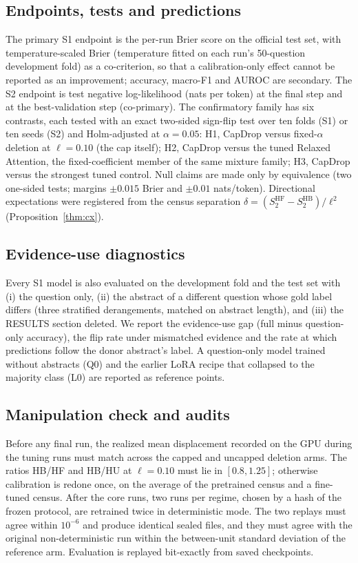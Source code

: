 \subsection{Endpoints, tests and predictions}
The primary S1 endpoint is the per-run Brier score on the official test set, with temperature-scaled
Brier (temperature fitted on each run's 50-question development fold) as a co-criterion, so that a
calibration-only effect cannot be reported as an improvement; accuracy, macro-F1 and AUROC are
secondary. The S2 endpoint is test negative log-likelihood (nats per token) at the final step and at the
best-validation step (co-primary). The confirmatory family has six contrasts, each tested with an exact
two-sided sign-flip test over ten folds (S1) or ten seeds (S2) and Holm-adjusted at $\alpha=0.05$:
H1, CapDrop versus fixed-$\alpha$ deletion at $\ell=0.10$ (the cap itself); H2, CapDrop versus the tuned
Relaxed Attention, the fixed-coefficient member of the same mixture family; H3, CapDrop versus the strongest tuned control. Null claims are
made only by equivalence (two one-sided tests; margins $\pm0.015$ Brier and $\pm0.01$ nats/token).
Directional expectations were registered from the census separation
$\delta=(S_2^{\mathrm{HF}}-S_2^{\mathrm{HB}})/\ell^2$ (Proposition~\ref{thm:cx}).

\subsection{Evidence-use diagnostics}
Every S1 model is also evaluated on the development fold and the test set with (i) the question only,
(ii) the abstract of a different question whose gold label differs (three stratified derangements,
matched on abstract length), and (iii) the RESULTS section deleted. We report the evidence-use gap
(full minus question-only accuracy), the flip rate under mismatched evidence and the rate at which
predictions follow the donor abstract's label. A question-only model trained without abstracts (Q0) and
the earlier LoRA recipe that collapsed to the majority class (L0) are reported as reference points.

\subsection{Manipulation check and audits}
Before any final run, the realized mean displacement recorded on the GPU during the tuning runs must match
across the capped and uncapped deletion arms. The ratios HB/HF and HB/HU at $\ell=0.10$ must lie in $[0.8,1.25]$;
otherwise calibration is redone once, on the average of the pretrained census and a fine-tuned census. After the core
runs, two runs per regime, chosen by a hash of the frozen protocol, are retrained twice in deterministic mode.
The two replays must agree within $10^{-6}$ and produce identical sealed files, and they must agree with the original
non-deterministic run within the between-unit standard deviation of the reference arm. Evaluation is replayed
bit-exactly from saved checkpoints.

